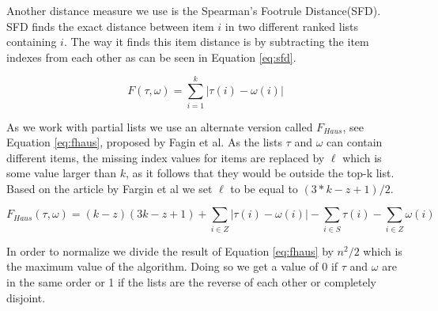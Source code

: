 Another distance measure we use is the Spearman's Footrule Distance(SFD)\cite{comparing:topk}. SFD finds the exact distance between item $i$ in two different ranked lists containing $i$. The way it finds this item distance is by subtracting the item indexes from each other as can be seen in Equation \ref{eq:sfd}. 

\begin{equation}\label{eq:sfd}
F(\tau, \omega) = \sum_{i=1}^{k} | \tau (i) - \omega (i) |
\end{equation}

As we work with partial lists we use an alternate version called $F_{Haus}$, see Equation \ref{eq:fhaus}, proposed by Fagin et al\citep{comparing:topk}.
As the lists $\tau$ and $\omega$ can contain different items, the missing index values for items are replaced by $\ell$ which is some value larger than $k$, as it follows that they would be outside the top-k list. Based on the article by Fargin et al we set $\ell$ to be equal to $(3 * k - z + 1)/2$.

\footnotesize
\begin{equation}\label{eq:fhaus}
F_{Haus}(\tau,\omega)= (k-z)(3k-z+1)+\sum_{i\in Z} | \tau (i) - \omega (i) | - \sum_{i\in S} \tau (i) - \sum_{i\in Z} \omega(i)
\end{equation}
\normalsize

In order to normalize we divide the result of Equation \ref{eq:fhaus} by $n^2 /2$ which is the maximum value of the algorithm. Doing so we get a value of 0 if $\tau$ and $\omega$ are in the same order or 1 if the lists are the reverse of each other or completely disjoint.